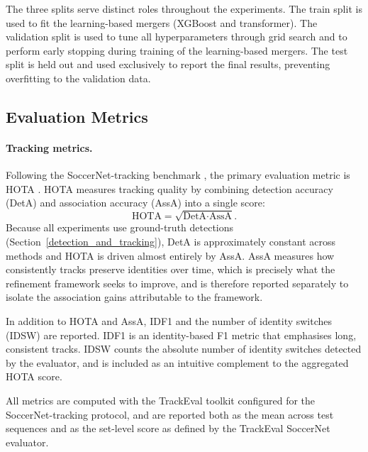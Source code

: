 The three splits serve distinct roles throughout the experiments. The train split is used to fit the learning-based mergers (XGBoost and transformer). The validation split is used to tune all hyperparameters through grid search and to perform early stopping during training of the learning-based mergers. The test split is held out and used exclusively to report the final results, preventing overfitting to the validation data.

\subsection{Evaluation Metrics}\label{subsec:metrics}

\paragraph{Tracking metrics.}
Following the SoccerNet-tracking benchmark \cite{cioppa2022soccernet}, the primary evaluation metric is HOTA \cite{hota}. HOTA measures tracking quality by combining detection accuracy (DetA) and association accuracy (AssA) into a single score:
\begin{equation}
    \text{HOTA} = \sqrt{\text{DetA} \cdot \text{AssA}}.
\end{equation}
Because all experiments use ground-truth detections (Section~\ref{detection_and_tracking}), DetA is approximately constant across methods and HOTA is driven almost entirely by AssA. AssA measures how consistently tracks preserve identities over time, which is precisely what the refinement framework seeks to improve, and is therefore reported separately to isolate the association gains attributable to the framework.

In addition to HOTA and AssA, IDF1 \cite{idf1} and the number of identity switches (IDSW) are reported. IDF1 is an identity-based F1 metric that emphasises long, consistent tracks. IDSW counts the absolute number of identity switches detected by the evaluator, and is included as an intuitive complement to the aggregated HOTA score.

All metrics are computed with the TrackEval toolkit \cite{trackeval} configured for the SoccerNet-tracking protocol, and are reported both as the mean across test sequences and as the set-level score as defined by the TrackEval SoccerNet evaluator.

